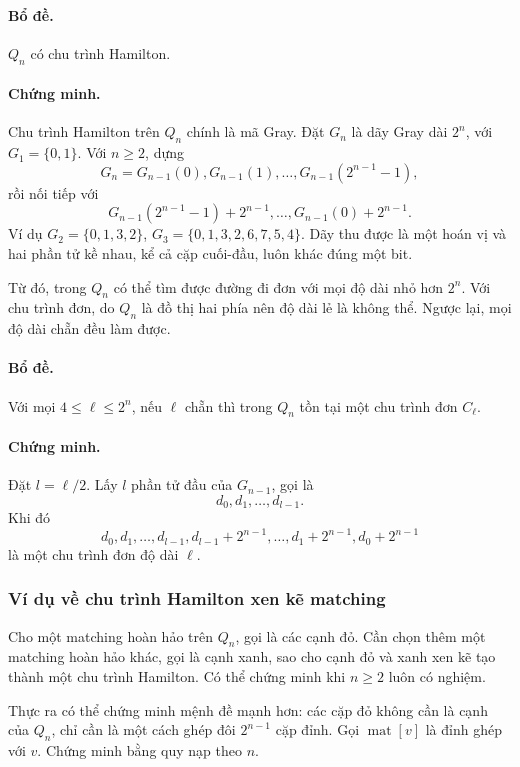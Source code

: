 \documentclass[11pt]{article}
\begin{document}
\paragraph{Bổ đề.}
\(Q_n\) có chu trình Hamilton.

\paragraph{Chứng minh.}
Chu trình Hamilton trên \(Q_n\) chính là mã Gray. Đặt \(G_n\) là dãy Gray dài
\(2^n\), với \(G_1=\{0,1\}\). Với \(n\ge 2\), dựng
\[
  G_n=
  G_{n-1}(0),G_{n-1}(1),\ldots,G_{n-1}(2^{n-1}-1),
\]
rồi nối tiếp với
\[
  G_{n-1}(2^{n-1}-1)+2^{n-1},\ldots,G_{n-1}(0)+2^{n-1}.
\]
Ví dụ \(G_2=\{0,1,3,2\}\), \(G_3=\{0,1,3,2,6,7,5,4\}\). Dãy thu được là một
hoán vị và hai phần tử kề nhau, kể cả cặp cuối-đầu, luôn khác đúng một bit.

Từ đó, trong \(Q_n\) có thể tìm được đường đi đơn với mọi độ dài nhỏ hơn
\(2^n\). Với chu trình đơn, do \(Q_n\) là đồ thị hai phía nên độ dài lẻ là
không thể. Ngược lại, mọi độ dài chẵn đều làm được.

\paragraph{Bổ đề.}
Với mọi \(4\le \ell\le 2^n\), nếu \(\ell\) chẵn thì trong \(Q_n\) tồn tại một
chu trình đơn \(C_\ell\).

\paragraph{Chứng minh.}
Đặt \(l=\ell/2\). Lấy \(l\) phần tử đầu của \(G_{n-1}\), gọi là
\[
  d_0,d_1,\ldots,d_{l-1}.
\]
Khi đó
\[
  d_0,d_1,\ldots,d_{l-1},d_{l-1}+2^{n-1},\ldots,d_1+2^{n-1},d_0+2^{n-1}
\]
là một chu trình đơn độ dài \(\ell\).

\subsubsection{Ví dụ về chu trình Hamilton xen kẽ matching}

Cho một matching hoàn hảo trên \(Q_n\), gọi là các cạnh đỏ. Cần chọn thêm một
matching hoàn hảo khác, gọi là cạnh xanh, sao cho cạnh đỏ và xanh xen kẽ tạo
thành một chu trình Hamilton. Có thể chứng minh khi \(n\ge 2\) luôn có nghiệm.

Thực ra có thể chứng minh mệnh đề mạnh hơn: các cặp đỏ không cần là cạnh của
\(Q_n\), chỉ cần là một cách ghép đôi \(2^{n-1}\) cặp đỉnh. Gọi \(\operatorname{mat}[v]\)
là đỉnh ghép với \(v\). Chứng minh bằng quy nạp theo \(n\).
\end{document}
